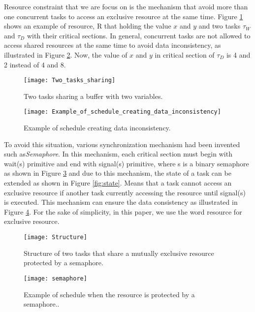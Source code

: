 Resource constraint that we are focus on is the mechanism that avoid more than one concurrent tasks to access an exclusive resource at the same time. Figure \ref{fig:Two_tasks_sharing} shows an example of resource, R that holding the value $x$ and $y$ and two tasks $\tau_{W}$ and $\tau_{D}$ with their critical sections. In general, concurrent tasks are not allowed to access shared resources at the same time to avoid data inconsistency, as illustrated in Figure \ref{fig:Example_of_schedule_creating_data_inconsistency}. Now, the value of $x$ and $y$ in critical section of $\tau_{D}$ is 4 and 2 instead of 4 and 8.

\begin{figure}[h]
    \centering
    \texttt{[image: Two\_tasks\_sharing]}
    \caption{ Two tasks sharing a buffer with two variables. \cite{b5}}
    \label{fig:Two_tasks_sharing}
\end{figure}

\begin{figure}[h]
    \centering
    \texttt{[image: Example\_of\_schedule\_creating\_data\_inconsistency]}
    \caption{Example of schedule creating data inconsistency. \cite{b5}}
    \label{fig:Example_of_schedule_creating_data_inconsistency}
\end{figure}


To avoid this situation, various synchronization mechanism had been invented such as\textit{Semaphore}. In this mechanism, each critical section must begin with wait(s) primitive and end with signal(s) primitive, where s is a binary semaphore as shown in Figure \ref{fig:Structure} and due to this mechanism, the state of a task can be extended as shown in Figure \ref{fig:state}. Means that a task cannot access an exclusive resource if another task currently accessing the resource until signal(s) is executed. This mechanism can ensure the data consistency as illustrated in Figure \ref{fig:semaphore}. For the sake of simplicity, in this paper, we use the word resource for exclusive resource. 

\begin{figure}[h]
    \centering
    \texttt{[image: Structure]}
    \caption{Structure of two tasks that share a mutually exclusive resource protected by
a semaphore. \cite{b5}}
    \label{fig:Structure}
\end{figure}


\begin{figure}[h]
    \centering
    \texttt{[image: semaphore]}
    \caption{Example of schedule when the resource is protected by a semaphore.. \cite{b5}}
    \label{fig:semaphore}
\end{figure}

